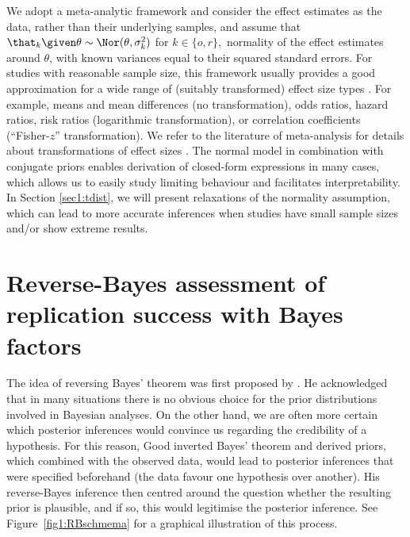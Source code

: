 We adopt a meta-analytic framework and consider the effect estimates as the
data, rather than their underlying samples, and assume that
$\that_k \given \theta \sim \Nor(\theta, \sigma^2_k)$ for $k \in \{o, r\},$ \ie
normality of the effect estimates around $\theta$, with known variances equal to
their squared standard errors. For studies with reasonable sample size, this
framework usually provides a good approximation for a wide range of (suitably
transformed) effect size types \citep[Chapter 2.4]{Spiegelhalter2004}. For
example, means and mean differences (no transformation), odds ratios, hazard
ratios, risk ratios (logarithmic transformation), or correlation coefficients
(``Fisher-$z$'' transformation). We refer to the literature of meta-analysis for
details about transformations of effect sizes \citep[\eg][Chapter
11.6]{Cooper2019}. The normal model in combination with conjugate priors enables
derivation of closed-form expressions in many cases, which allows us to easily
study limiting behaviour and facilitates interpretability. In Section
\ref{sec1:tdist}, we will present relaxations of the normality assumption, which
can lead to more accurate inferences when studies have small sample sizes and/or
show extreme results.


\section{Reverse-Bayes assessment of replication success with Bayes factors}
\label{sec1:methods}
The idea of reversing Bayes' theorem was first proposed by \citet{Good1950}. He
acknowledged that in many situations there is no obvious choice for the prior
distributions involved in Bayesian analyses. On the other hand, we are often
more certain which posterior inferences would convince us regarding the
credibility of a hypothesis. For this reason, Good inverted Bayes' theorem and
derived priors, which combined with the observed data, would lead to posterior
inferences that were specified beforehand (\eg the data favour one hypothesis
over another). His reverse-Bayes inference then centred around the question
whether the resulting prior is plausible, and if so, this would legitimise the
posterior inference. See Figure~\ref{fig1:RBschmema} for a graphical illustration
of this process.

